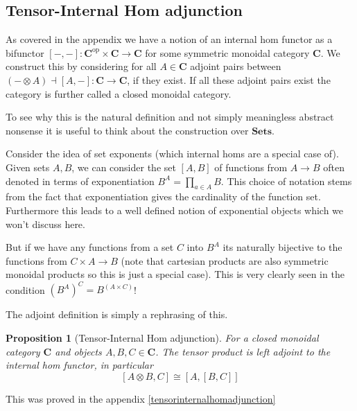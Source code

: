 \documentclass[12pt]{article}
\numberwithin{equation}{section}
\newtheorem{proposition}{Proposition}[section]
\begin{document}
	
	\subsection{Tensor-Internal Hom adjunction}
	As covered in the appendix we have a notion of an internal hom functor as a bifunctor $[-,-]:  \mathbf{C}^\mathrm{op} \times \mathbf{C} \to \mathbf{C}$ for some symmetric monoidal category $\mathbf{C}$. We construct this by considering for all $A \in \mathbf{C}$ adjoint pairs between $(-\otimes A) \dashv [A,-]: \mathbf{C}\to \mathbf{C}$, if they exist. If all these adjoint pairs exist the category is further called a closed monoidal category. 
	
	To see why this is the natural definition and not simply meaningless abstract nonsense it is useful to think about the construction over $\mathbf{Sets}$. 
	
	Consider the idea of set exponents (which internal homs are a special case of). Given sets $A, B$, we can consider the set $[A,B]$ of functions from $A \to B$ often denoted in terms of exponentiation $B^A= \prod_{a \in A} B$. This choice of notation stems from the fact that exponentiation gives the cardinality of the function set. Furthermore this leads to a well defined notion of exponential objects which we won't discuss here.
	
	But if we have any functions from a set $C$ into $B^A$ its naturally bijective to the functions from $C \times A \to B$ (note that cartesian products are also symmetric monoidal products so this is just a special case). This is very clearly seen in the condition $(B^A)^C=B^{(A\times C)} $! 
	
	The adjoint definition is simply a rephrasing of this.
	

	
	\begin{proposition}[Tensor-Internal Hom adjunction]
		For a closed monoidal category $\mathbf C$ and objects $A,B,C \in \mathbf{C}$. The tensor product is left adjoint to the internal hom functor, in particular
		\[ [A\otimes B,C ] \cong [A, [B,C]] \]
	\end{proposition}
	This was proved in the appendix \ref{tensorinternalhomadjunction}
	
\end{document}
